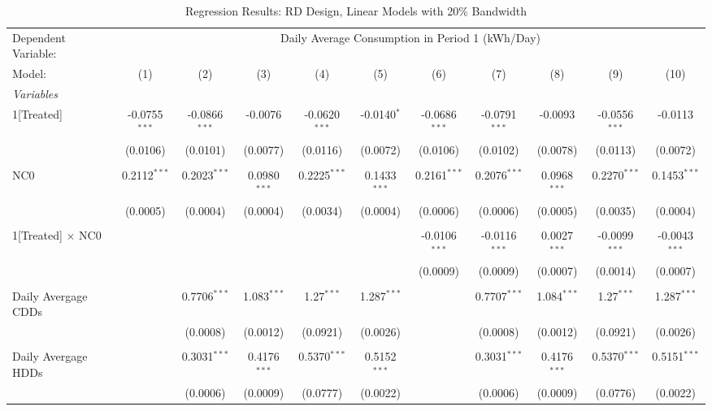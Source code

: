 \begin{table}[htbp]
\centering
\caption{\label{Table:Regression-Results_RD_Linear_BW-20} Regression Results: RD Design, Linear Models with 20\% Bandwidth}
\begin{adjustbox}{scale = 0.75}
\begin{tabular}{lcccccccccc}
\tabularnewline\toprule\toprule
Dependent Variable:&\multicolumn{10}{c}{Daily Average Consumption in Period 1 (kWh/Day)}\\
Model:&(1) & (2) & (3) & (4) & (5) & (6) & (7) & (8) & (9) & (10)\\
\midrule
\emph{Variables}&   &   &   &   &   &   &   &   &   &  \\
1[Treated]&-0.0755$^{***}$ & -0.0866$^{***}$ & -0.0076 & -0.0620$^{***}$ & -0.0140$^{*}$ & -0.0686$^{***}$ & -0.0791$^{***}$ & -0.0093 & -0.0556$^{***}$ & -0.0113\\
  &(0.0106) & (0.0101) & (0.0077) & (0.0116) & (0.0072) & (0.0106) & (0.0102) & (0.0078) & (0.0113) & (0.0072)\\
& & & & & & & & & & \\
NC0&0.2112$^{***}$ & 0.2023$^{***}$ & 0.0980$^{***}$ & 0.2225$^{***}$ & 0.1433$^{***}$ & 0.2161$^{***}$ & 0.2076$^{***}$ & 0.0968$^{***}$ & 0.2270$^{***}$ & 0.1453$^{***}$\\
  &(0.0005) & (0.0004) & (0.0004) & (0.0034) & (0.0004) & (0.0006) & (0.0006) & (0.0005) & (0.0035) & (0.0004)\\
& & & & & & & & & & \\
1[Treated] $\times $ NC0&   &    &    &    &    & -0.0106$^{***}$ & -0.0116$^{***}$ & 0.0027$^{***}$ & -0.0099$^{***}$ & -0.0043$^{***}$\\
  &   &    &    &    &    & (0.0009) & (0.0009) & (0.0007) & (0.0014) & (0.0007)\\
& & & & & & & & & & \\
Daily Avergage CDDs&   & 0.7706$^{***}$ & 1.083$^{***}$ & 1.27$^{***}$ & 1.287$^{***}$ &    & 0.7707$^{***}$ & 1.084$^{***}$ & 1.27$^{***}$ & 1.287$^{***}$\\
  &   & (0.0008) & (0.0012) & (0.0921) & (0.0026) &    & (0.0008) & (0.0012) & (0.0921) & (0.0026)\\
& & & & & & & & & & \\
Daily Avergage HDDs&   & 0.3031$^{***}$ & 0.4176$^{***}$ & 0.5370$^{***}$ & 0.5152$^{***}$ &    & 0.3031$^{***}$ & 0.4176$^{***}$ & 0.5370$^{***}$ & 0.5151$^{***}$\\
  &   & (0.0006) & (0.0009) & (0.0777) & (0.0022) &    & (0.0006) & (0.0009) & (0.0776) & (0.0022)\\

\end{tabular}
\end{adjustbox}
\end{table}
